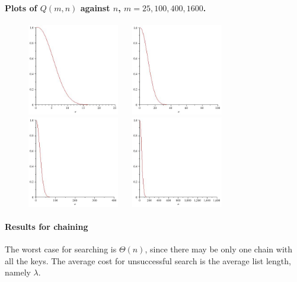 \paragraph{Plots of $Q(m, n)$ against $n$, $m=25,100,400,1600$.}
\begin{figure}
\centering
\includegraphics[width=4cm]{figs/birthday25.jpg}
$\quad$
\includegraphics[width=4cm]{figs/birthday100.jpg}\\
\includegraphics[width=4cm]{figs/birthday400.jpg}
$\quad$
\includegraphics[width=4cm]{figs/birthday1600.jpg}
\end{figure}

\paragraph{Results for chaining}

The worst case for searching is $\Theta(n)$, since there may be only one 
chain with all the keys. The average cost for unsuccessful search is the average list length, 
namely $\lambda$.

